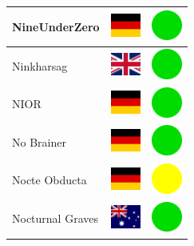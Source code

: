 \documentclass[12pt, a4paper, twoside]{report}
\begin{document}
\begin{center}
\begin{longtable}{|p{5cm}|p{2cm}|p{2cm}|}
 NineUnderZero                                              & \includegraphics[width=1cm]{4x3/de} &   \includegraphics[width=1cm]{likes/y} \\ \hline
 Ninkharsag                                                 & \includegraphics[width=1cm]{4x3/gb} &   \includegraphics[width=1cm]{likes/y} \\ \hline
 NIOR                                                       & \includegraphics[width=1cm]{4x3/de} &   \includegraphics[width=1cm]{likes/y} \\ \hline
 No Brainer                                                 & \includegraphics[width=1cm]{4x3/de} &   \includegraphics[width=1cm]{likes/y} \\ \hline
 Nocte Obducta                                              & \includegraphics[width=1cm]{4x3/de} &   \includegraphics[width=1cm]{likes/m} \\ \hline
 Nocturnal Graves                                           & \includegraphics[width=1cm]{4x3/au} &   \includegraphics[width=1cm]{likes/y} \\ \hline

\end{longtable}
\end{center}
\end{document}
